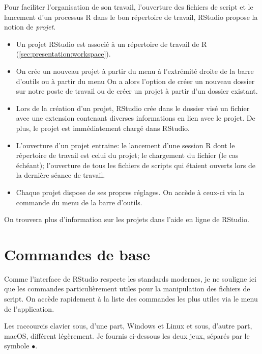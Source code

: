 Pour faciliter l'organisation de son travail, l'ouverture des fichiers
de script et le lancement d'un processus R dans le bon répertoire de
travail, RStudio propose la notion de \emph{projet}.
\begin{itemize}
\item Un projet RStudio est associé à un répertoire de travail de R
  (\autoref{sec:presentation:workspace}).
\item On crée un nouveau projet à partir du menu  à
  l'extrémité droite de la barre d'outils ou à partir du menu
   On a alors l'option de créer un nouveau
  dossier sur notre poste de travail ou de créer un projet à partir
  d'un dossier existant.
\item Lors de la création d'un projet, RStudio crée dans le dossier
  visé un fichier avec une extension  contenant diverses
  informations en lien avec le projet. De plus, le projet est
  immédiatement chargé dans RStudio.
\item L'ouverture d'un projet entraine: le lancement d'une session R
  dont le répertoire de travail est celui du projet; le
  chargement du fichier  (le cas échéant); l'ouverture de
  tous les fichiers de scripts qui étaient ouverts lors de la dernière
  séance de travail.
\item Chaque projet dispose de ses propres réglages. On accède à
  ceux-ci via la commande  du menu
   de la barre d'outils.
\end{itemize}

On trouvera plus d'information sur les projets dans l'aide en ligne
de RStudio.


\section{Commandes de base}
\label{sec:rstudio:commandes}

Comme l'interface de RStudio respecte les standards modernes, je ne
souligne ici que les commandes particulièrement utiles pour la
manipulation des fichiers de script. On accède rapidement à la liste
des commandes les plus utiles via le menu  de
l'application.

Les raccourcis clavier sous, d'une part, Windows et Linux et sous,
d'autre part, macOS, différent légèrement. Je fournis ci-dessous
les deux jeux, séparés par le symbole $\bullet$.

